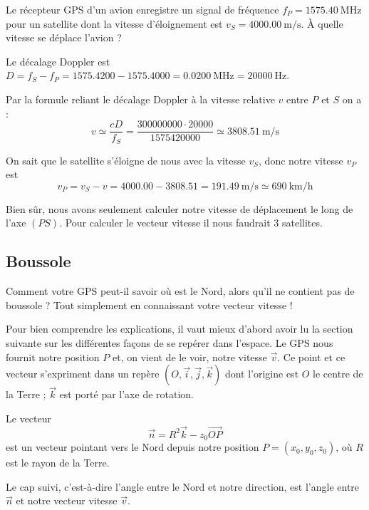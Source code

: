 \documentclass[class=report,crop=false]{standalone}
\newcommand{\vect}{\overrightarrow}
\begin{document}
\begin{exemple}
Le récepteur GPS d'un avion enregistre un signal de fréquence
$f_P = \SI{1575.40}{\mega\hertz}$ pour un satellite dont
la vitesse d'éloignement est $v_S = \SI{4000.00}{\meter\per\second}$.
À quelle vitesse se déplace l'avion ?

Le décalage Doppler est $D=f_S-f_P
= \num{1575.4200} - \num{1575.4000} = \SI{0.0200}{\mega\hertz} = \SI{20 000}{\hertz}$.

Par la formule reliant le décalage Doppler à la vitesse relative
$v$ entre $P$ et $S$ on a :
$$v \simeq \frac{c D}{f_S} = \frac{\num{300 000 000} \cdot \num{20000}}{\num{1 575 420 000}}
\simeq \SI{3808.51}{\meter\per\second}$$

On sait que le satellite s'éloigne de nous avec la vitesse $v_S$,
donc notre vitesse $v_P$ est
$$v_P = v_S - v = \num{4000.00}-\num{3808.51} = \SI{191.49}{\meter\per\second}
\simeq \SI{690}{\kilo\meter\per\hour}$$


Bien sûr, nous avons seulement calculer notre vitesse 
de déplacement le long de l'axe $(PS)$. Pour calculer le vecteur vitesse
il nous faudrait $3$ satellites.
\end{exemple}





\subsection{Boussole}

Comment votre GPS peut-il savoir où est le Nord, 
alors qu'il ne contient pas de boussole ?
Tout simplement en connaissant votre vecteur vitesse !

Pour bien comprendre les explications, il vaut mieux d'abord avoir lu la section suivante
sur les différentes façons de se repérer dans l'espace.
Le GPS nous fournit notre position $P$ et, on vient de le voir, notre vitesse $\vect v$.
Ce point et ce vecteur s'expriment dans un repère $(O,\vect i,\vect j,\vect k)$
dont l'origine est $O$ le centre de la Terre ; $\vect k$ est porté par l'axe de rotation.


\begin{proposition}
Le vecteur 
$$\vect n = R^2 \vect{k} - z_0 \vect{OP}$$
est un vecteur pointant vers le Nord depuis notre position
$P = (x_0,y_0,z_0)$, où $R$ est le rayon de la Terre.

Le cap suivi, c'est-à-dire l'angle entre le Nord et notre direction, est 
l'angle entre $\vect n$ et notre vecteur vitesse $\vect v$.
\end{proposition}
\end{document}
